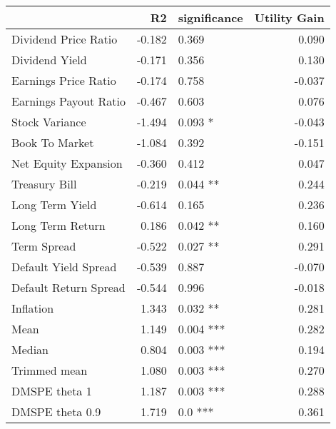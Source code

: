 \begin{tabular}{lrlr}
\toprule
{} &     R2 & significance &  Utility Gain \\
\midrule
Dividend Price Ratio  & -0.182 &       0.369  &         0.090 \\
Dividend Yield        & -0.171 &       0.356  &         0.130 \\
Earnings Price Ratio  & -0.174 &       0.758  &        -0.037 \\
Earnings Payout Ratio & -0.467 &       0.603  &         0.076 \\
Stock Variance        & -1.494 &      0.093 * &        -0.043 \\
Book To Market        & -1.084 &       0.392  &        -0.151 \\
Net Equity Expansion  & -0.360 &       0.412  &         0.047 \\
Treasury Bill         & -0.219 &     0.044 ** &         0.244 \\
Long Term Yield       & -0.614 &       0.165  &         0.236 \\
Long Term Return      &  0.186 &     0.042 ** &         0.160 \\
Term Spread           & -0.522 &     0.027 ** &         0.291 \\
Default Yield Spread  & -0.539 &       0.887  &        -0.070 \\
Default Return Spread & -0.544 &       0.996  &        -0.018 \\
Inflation             &  1.343 &     0.032 ** &         0.281 \\
Mean                  &  1.149 &    0.004 *** &         0.282 \\
Median                &  0.804 &    0.003 *** &         0.194 \\
Trimmed mean          &  1.080 &    0.003 *** &         0.270 \\
DMSPE theta 1         &  1.187 &    0.003 *** &         0.288 \\
DMSPE theta 0.9       &  1.719 &      0.0 *** &         0.361 \\
\bottomrule
\end{tabular}

